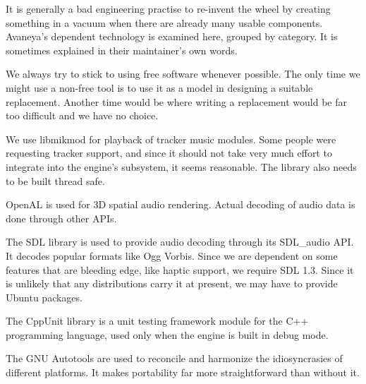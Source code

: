 

It is generally a bad engineering practise to re-invent the wheel by creating something in a vacuum when there are already many usable components. Avaneya's dependent technology is examined here, grouped by category. It is sometimes explained in their maintainer's own words.

We always try to stick to using free software whenever possible. The only time we might use a non-free tool is to use it as a model in designing a suitable replacement. Another time would be where writing a replacement would be far too difficult and we have no choice.


\startitemize[3]
\setupwhitespace[big]

We use libmikmod for playback of tracker music modules. Some people were requesting tracker support, and since it should not take very much effort to integrate into the engine's {\about[AudioManager]} subsystem, it seems reasonable. The library also needs to be built thread safe.


OpenAL is used for 3D spatial audio rendering. Actual decoding of audio data is done through other APIs.


The SDL library is used to provide audio decoding through its SDL_audio API. It decodes popular formats like Ogg Vorbis. Since we are dependent on some features that are bleeding edge, like haptic support, we require SDL 1.3. Since it is unlikely that any distributions carry it at present, we may have to provide Ubuntu packages.
\stopitemize


\startitemize[3]
\setupwhitespace[big]

The CppUnit library is a unit testing framework module for the C++ programming language, used only when the engine is built in debug mode.


The GNU Autotools are used to reconcile and harmonize the idiosyncrasies of different platforms. It makes portability far more straightforward than without it.

